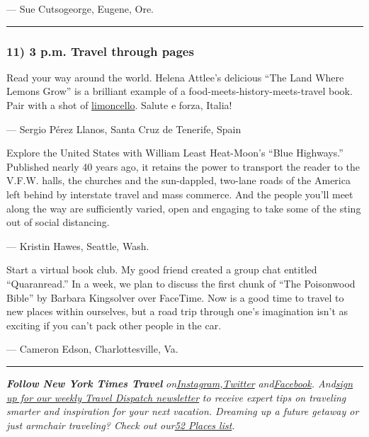 --- Sue Cutsogeorge, Eugene, Ore.

\begin{center}\rule{0.5\linewidth}{\linethickness}\end{center}

\hypertarget{11-3-pm-travel-through-pages}{%
\subsubsection{\texorpdfstring{\textbf{11) 3 p.m. Travel through
pages}}{11) 3 p.m. Travel through pages}}\label{11-3-pm-travel-through-pages}}

Read your way around the world. Helena Attlee's delicious ``The Land
Where Lemons Grow'' is a brilliant example of a
food-meets-history-meets-travel book. Pair with a shot of
\href{https://cooking.nytimes3xbfgragh.onion/recipes/1015304-limoncello-once-removed}{limoncello}.
Salute e forza, Italia!

--- Sergio Pérez Llanos, Santa Cruz de Tenerife, Spain

Explore the United States with William Least Heat-Moon's ``Blue
Highways.'' Published nearly 40 years ago, it retains the power to
transport the reader to the V.F.W. halls, the churches and the
sun-dappled, two-lane roads of the America left behind by interstate
travel and mass commerce. And the people you'll meet along the way are
sufficiently varied, open and engaging to take some of the sting out of
social distancing.

--- Kristin Hawes, Seattle, Wash.

Start a virtual book club. My good friend created a group chat entitled
``Quaranread.'' In a week, we plan to discuss the first chunk of ``The
Poisonwood Bible'' by Barbara Kingsolver over FaceTime. Now is a good
time to travel to new places within ourselves, but a road trip through
one's imagination isn't as exciting if you can't pack other people in
the car.

--- Cameron Edson, Charlottesville, Va.

\begin{center}\rule{0.5\linewidth}{\linethickness}\end{center}

\emph{\textbf{Follow New York Times Travel}}
\emph{on}\href{https://www.instagram.com/nytimestravel/}{\emph{Instagram}}\emph{,}\href{https://twitter.com/nytimestravel}{\emph{Twitter}}
\emph{and}\href{https://www.facebookcorewwwi.onion/nytimestravel/}{\emph{Facebook}}\emph{.
And}\href{https://www.nytimes3xbfgragh.onion/newsletters/traveldispatch}{\emph{sign
up for our weekly Travel Dispatch newsletter}} \emph{to receive expert
tips on traveling smarter and inspiration for your next vacation.
Dreaming up a future getaway or just armchair traveling? Check out
our}\href{https://www.nytimes3xbfgragh.onion/interactive/2020/travel/places-to-visit.html}{\emph{52
Places list}}\emph{.}


